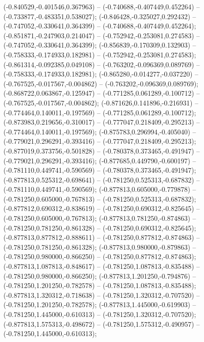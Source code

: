  (-0.840529,-0.401546,0.367963) -- (-0.740688,-0.407449,0.452264) -- (-0.733877,-0.483351,0.538027);
 (-0.846428,-0.325027,0.292432) -- (-0.747052,-0.330641,0.364399) -- (-0.740688,-0.407449,0.452264);
 (-0.851871,-0.247903,0.214047) -- (-0.752942,-0.253081,0.274583) -- (-0.747052,-0.330641,0.364399);
 (-0.856839,-0.170309,0.132903) -- (-0.758333,-0.174933,0.182981) -- (-0.752942,-0.253081,0.274583);
 (-0.861314,-0.092385,0.049108) -- (-0.763202,-0.096369,0.089769) -- (-0.758333,-0.174933,0.182981);
 (-0.865280,-0.014277,-0.037220) -- (-0.767525,-0.017567,-0.004862) -- (-0.763202,-0.096369,0.089769);
 (-0.868722,0.063867,-0.125947) -- (-0.771285,0.061289,-0.100712) -- (-0.767525,-0.017567,-0.004862);
 (-0.871626,0.141896,-0.216931) -- (-0.774464,0.140011,-0.197569) -- (-0.771285,0.061289,-0.100712);
 (-0.873983,0.219656,-0.310017) -- (-0.777047,0.218409,-0.295213) -- (-0.774464,0.140011,-0.197569);
 (-0.875783,0.296994,-0.405040) -- (-0.779021,0.296291,-0.393416) -- (-0.777047,0.218409,-0.295213);
 (-0.877019,0.373756,-0.501828) -- (-0.780378,0.373465,-0.491947) -- (-0.779021,0.296291,-0.393416);
 (-0.877685,0.449790,-0.600197) -- (-0.781110,0.449741,-0.590569) -- (-0.780378,0.373465,-0.491947);
 (-0.877813,0.525312,-0.698641) -- (-0.781250,0.525313,-0.687832) -- (-0.781110,0.449741,-0.590569);
 (-0.877813,0.605000,-0.779878) -- (-0.781250,0.605000,-0.767813) -- (-0.781250,0.525313,-0.687832);
 (-0.877812,0.690312,-0.838619) -- (-0.781250,0.690312,-0.825645) -- (-0.781250,0.605000,-0.767813);
 (-0.877813,0.781250,-0.874863) -- (-0.781250,0.781250,-0.861328) -- (-0.781250,0.690312,-0.825645);
 (-0.877813,0.877812,-0.888611) -- (-0.781250,0.877812,-0.874863) -- (-0.781250,0.781250,-0.861328);
 (-0.877813,0.980000,-0.879863) -- (-0.781250,0.980000,-0.866250) -- (-0.781250,0.877812,-0.874863);
 (-0.877813,1.087813,-0.848617) -- (-0.781250,1.087813,-0.835488) -- (-0.781250,0.980000,-0.866250);
 (-0.877813,1.201250,-0.794876) -- (-0.781250,1.201250,-0.782578) -- (-0.781250,1.087813,-0.835488);
 (-0.877813,1.320312,-0.718638) -- (-0.781250,1.320312,-0.707520) -- (-0.781250,1.201250,-0.782578);
 (-0.877813,1.445000,-0.619903) -- (-0.781250,1.445000,-0.610313) -- (-0.781250,1.320312,-0.707520);
 (-0.877813,1.575313,-0.498672) -- (-0.781250,1.575312,-0.490957) -- (-0.781250,1.445000,-0.610313);
